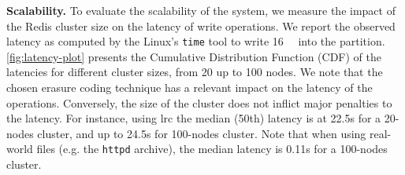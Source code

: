 %

\textbf{Scalability.}
\label{subsec:latency}
To evaluate the scalability of the system, we measure the impact of the Redis cluster size on the latency of write operations.
We report the observed latency as computed by the Linux's \texttt{time} tool to write \SI{16}{\mebi\byte} into the \SYS partition.
\autoref{fig:latency-plot} presents the Cumulative Distribution Function (CDF) of the latencies for different cluster sizes, from 20 up to 100 nodes.
We note that the chosen erasure coding technique has a relevant impact on the latency of the operations. 
Conversely, the size of the cluster does not inflict major penalties to the latency.
For instance, using \ac{lrc} the median (50th) latency is at 22.5s for a 20-nodes cluster, and up to 24.5s for 100-nodes cluster. 
Note that when using real-world files (e.g. the \texttt{httpd} archive), the median latency is 0.11s for a 100-nodes cluster. 


